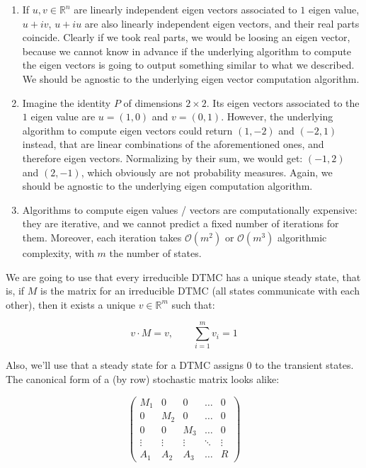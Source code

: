 \documentclass[
  nojss]{jss}
\begin{document}
\begin{enumerate}
\def\labelenumi{\arabic{enumi}.}
\item
  If \(u, v \in \mathbb{R}^n\) are linearly independent eigen vectors associated to \(1\) eigen value, \(u + iv\), \(u + iu\) are also linearly independent eigen vectors, and their real parts coincide. Clearly if we took real parts, we would be loosing an eigen vector, because we cannot know in advance if the underlying algorithm to compute the eigen vectors is going to output something similar to what we described. We should be agnostic to the underlying eigen vector computation algorithm.
\item
  Imagine the identity \(P\) of dimensions \(2 \times 2\). Its eigen vectors associated to the \(1\) eigen value are \(u = (1, 0)\) and \(v = (0, 1)\). However, the underlying algorithm to compute eigen vectors could return \((1, -2)\) and \((-2, 1)\) instead, that are linear combinations of the aforementioned ones, and therefore eigen vectors. Normalizing by their sum, we would get: \((-1, 2)\) and \((2, -1)\), which obviously are not probability measures. Again, we should be agnostic to the underlying eigen computation algorithm.
\item
  Algorithms to compute eigen values / vectors are computationally expensive: they are iterative, and we cannot predict a fixed number of iterations for them. Moreover, each iteration takes \(\mathcal{O}(m^2)\) or \(\mathcal{O}(m^3)\) algorithmic complexity, with \(m\) the number of states.
\end{enumerate}

We are going to use that every irreducible DTMC has a unique steady state, that is, if \(M\) is the matrix for an irreducible DTMC (all states communicate with each other), then it exists a unique \(v \in \mathbb{R}^m\) such that:

\[ v \cdot M = v, \qquad \sum_{i = 1}^m v_i = 1 \]

Also, we'll use that a steady state for a DTMC assigns \(0\) to the transient states. The canonical form of a (by row) stochastic matrix looks alike:

\[
\left(\begin{array}{c|c|c|c|c}
M_1 & 0 & 0 & \ldots & 0 \\
\hline
0 & M_2 & 0 & \ldots & 0 \\
\hline
0 & 0 & M_3 & \ldots & 0 \\
\hline
\vdots & \vdots & \vdots & \ddots & \vdots \\
\hline
A_1 & A_2 & A_3 & \ldots & R
\end{array}\right)
\]
\end{document}
